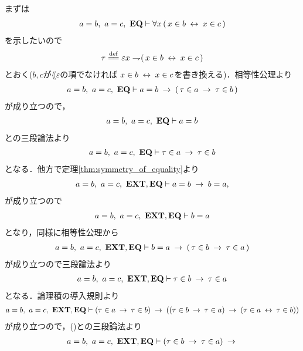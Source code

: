 	\begin{sketch}
		まずは
		\begin{align}
			a = b,\ a = c,\ \mbox{{\bf EQ}} \vdash \forall x\, (\, x \in b \hspace{0.25em}\leftrightarrow\hspace{0.25em} x \in c\, )
		\end{align}
		を示したいので
		\begin{align}
			\tau \defeq \varepsilon x \negation (\, x \in b \lrarrow x \in c\, )
		\end{align}
		とおく($b,c$が$\lang{\varepsilon}$の項でなければ
		$x \in b \hspace{0.25em}\leftrightarrow\hspace{0.25em} x \in c$を書き換える)．相等性公理より
		\begin{align}
			a = b,\ a = c,\ \mbox{{\bf EQ}} \vdash a = b \hspace{0.25em}\rightarrow\hspace{0.25em} (\, \tau \in a \hspace{0.25em}\rightarrow\hspace{0.25em} \tau \in b\, )
		\end{align}
		が成り立つので，
		\begin{align}
			a = b,\ a = c,\ \mbox{{\bf EQ}} \vdash a = b
		\end{align}
		との三段論法より
		\begin{align}
			a = b,\ a = c,\ \mbox{{\bf EQ}} \vdash \tau \in a \hspace{0.25em}\rightarrow\hspace{0.25em} \tau \in b
			\label{fom:thm_transitive_law_of_equality_1}
		\end{align}
		となる．他方で定理\ref{thm:symmetry_of_equality}より
		\begin{align}
			a = b,\ a = c,\ \mbox{{\bf EXT}},\mbox{{\bf EQ}} \vdash a = b \hspace{0.25em}\rightarrow\hspace{0.25em} b = a, \\
		\end{align}
		が成り立つので
		\begin{align}
			a = b,\ a = c,\ \mbox{{\bf EXT}},\mbox{{\bf EQ}} \vdash b = a
		\end{align}
		となり，同様に相等性公理から
		\begin{align}
			a = b,\ a = c,\ \mbox{{\bf EXT}},\mbox{{\bf EQ}} \vdash b = a \hspace{0.25em}\rightarrow\hspace{0.25em} (\, \tau \in b \hspace{0.25em}\rightarrow\hspace{0.25em} \tau \in a\, )
		\end{align}
		が成り立つので三段論法より
		\begin{align}
			a = b,\ a = c,\ \mbox{{\bf EXT}},\mbox{{\bf EQ}} \vdash \tau \in b \hspace{0.25em}\rightarrow\hspace{0.25em} \tau \in a
			\label{fom:thm_transitive_law_of_equality_2}
		\end{align}
		となる．論理積の導入規則より
		\begin{align}
			a = b,\ a = c,\ \mbox{{\bf EXT}},\mbox{{\bf EQ}} \vdash (\tau \in a \hspace{0.25em}\rightarrow\hspace{0.25em} \tau \in b)
			\hspace{0.25em}\rightarrow\hspace{0.25em} ((\tau \in b \hspace{0.25em}\rightarrow\hspace{0.25em} \tau \in a) \hspace{0.25em}\rightarrow\hspace{0.25em} 
			(\tau \in a \hspace{0.25em}\leftrightarrow\hspace{0.25em} \tau \in b))
		\end{align}
		が成り立つので，()との三段論法より
		\begin{align}
			a = b,\ a = c,\ \EXTAX,\EQAX \vdash (\tau \in b \rarrow \tau \in a) \rarrow 

\end{align}
\end{sketch}
